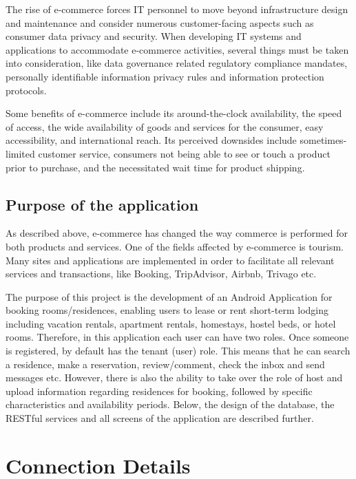 \documentclass[12pt]{article}
\begin{document}
	The rise of e-commerce forces IT personnel to move beyond infrastructure design and maintenance and consider numerous customer-facing aspects such as consumer data privacy and security. When developing IT systems and applications to accommodate e-commerce activities, several things must be taken into consideration, like data governance related regulatory compliance mandates, personally identifiable information privacy rules and information protection protocols.
	
	Some benefits of e-commerce include its around-the-clock availability, the speed of access, the wide availability of goods and services for the consumer, easy accessibility, and international reach. Its perceived downsides include sometimes-limited customer service, consumers not being able to see or touch a product prior to purchase, and the necessitated wait time for product shipping.
	
	\subsection{Purpose of the application}
	
	As described above, e-commerce has changed the way commerce is performed for both products and services. One of the fields affected by e-commerce is tourism. Many sites and applications are implemented in order to facilitate all relevant services and transactions, like Booking, TripAdvisor, Airbnb, Trivago etc.
	
	The purpose of this project is the development of an Android Application for booking rooms/residences, enabling users to lease or rent short-term lodging including vacation rentals, apartment rentals, homestays, hostel beds, or hotel rooms. Therefore, in this application each user can have two roles. Once someone is registered, by default has the tenant (user) role. This means that he can search a residence, make a reservation, review/comment, check the inbox and send messages etc. However, there is also the ability to take over the role of host and upload information regarding residences for booking, followed by specific characteristics and availability periods. Below, the design of the database, the RESTful services and all screens of the application are described further.
	
	\section{Connection Details}
	
\end{document}
